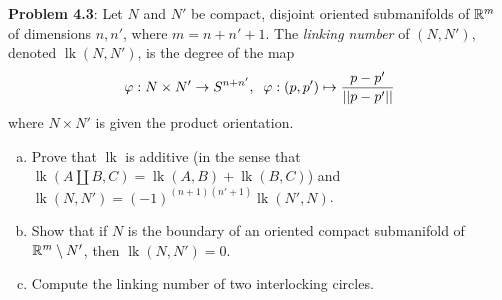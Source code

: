 \documentclass{amsart}
\DeclareMathOperator{\lk}{\mathrm{lk}}
\begin{document}
	\newpage 
	
	\textbf{Problem 4.3}: Let $N$ and $N'$ be compact, disjoint oriented submanifolds of $\mathbb{R}^m$ of dimensions $n,n'$, where $m=n+n'+1$. The \textit{linking number} of $(N,N')$, denoted $\lk(N,N')$, is the degree of the map
	$$
	\varphi: N\times N' \to S^{n+n'}, \;\; \varphi:(p,p')\mapsto \frac{p-p'}{||p-p'||}
	$$
	where $N\times N'$ is given the product orientation.
	
	\begin{enumerate}[(a)]
		\item Prove that $\lk$ is additive (in the sense that $\lk(A\coprod B,C) = \lk(A,B) + \lk(B,C)$) and $\lk(N,N') = (-1)^{(n+1)(n'+1)}\lk(N',N)$.
		\item Show that if $N$ is the boundary of an oriented compact submanifold of $\mathbb{R}^m\setminus N'$, then $\lk(N,N')=0$.
		\item Compute the linking number of two interlocking circles.
	\end{enumerate}
	
\end{document}
